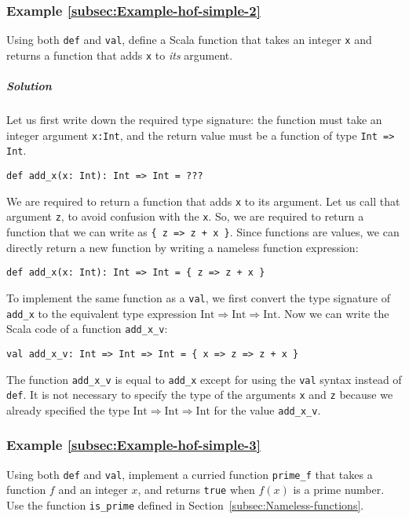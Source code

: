 \subsubsection{Example \label{subsec:Example-hof-simple-2}\ref{subsec:Example-hof-simple-2}}

Using both \lstinline!def! and \lstinline!val!, define a Scala function
that takes an integer \lstinline!x! and returns a function that adds
\lstinline!x! to \emph{its} argument.

\subparagraph{Solution}

Let us first write down the required type signature: the function
must take an integer argument \lstinline!x:Int!, and the return value
must be a function of type \lstinline!Int => Int!.
\begin{lstlisting}
def add_x(x: Int): Int => Int = ???
\end{lstlisting}
We are required to return a function that adds \lstinline!x! to its
argument. Let us call that argument \lstinline!z!, to avoid confusion
with the \lstinline!x!. So, we are required to return a function
that we can write as \lstinline!{ z => z + x }!. Since functions
are values, we can directly return a new function by writing a nameless
function expression:
\begin{lstlisting}
def add_x(x: Int): Int => Int = { z => z + x }
\end{lstlisting}
To implement the same function as a \lstinline!val!, we first convert
the type signature of \lstinline!add_x! to the equivalent type expression
$\text{Int}\Rightarrow\text{Int}\Rightarrow\text{Int}$. Now we can
write the Scala code of a function \lstinline!add_x_v!:
\begin{lstlisting}
val add_x_v: Int => Int => Int = { x => z => z + x }
\end{lstlisting}
The function \lstinline!add_x_v! is equal to \lstinline!add_x! except
for using the \lstinline!val! syntax instead of \lstinline!def!.
It is not necessary to specify the type of the arguments \lstinline!x!
and \lstinline!z! because we already specified the type $\text{Int}\Rightarrow\text{Int}\Rightarrow\text{Int}$
for the value \lstinline!add_x_v!. 

\subsubsection{Example \label{subsec:Example-hof-simple-3}\ref{subsec:Example-hof-simple-3}}

Using both \lstinline!def! and \lstinline!val!, implement a curried
function \lstinline!prime_f! that takes a function $f$ and an integer
$x$, and returns \lstinline!true! when $f(x)$ is a prime number.
Use the function \lstinline!is_prime! defined in Section~\ref{subsec:Nameless-functions}. 

